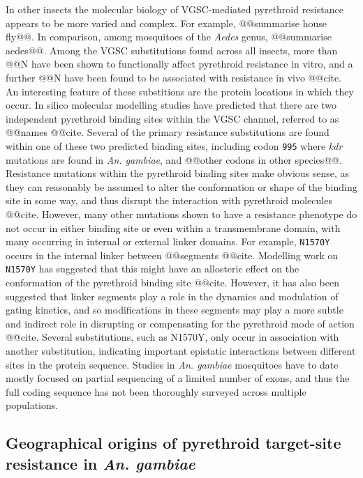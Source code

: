 \documentclass[a4paper,11pt,abstracton,hidelinks]{scrartcl}
\newcommand{\agam}{\textit{An. gambiae}\xspace}
\begin{document}
%
In other insects the molecular biology of VGSC-mediated pyrethroid resistance appears to be more varied and complex.
%
For example, @@summarise house fly@@.
%
In comparison, among mosquitoes of the \textit{Aedes} genus, @@summarise aedes@@.
%
Among the VGSC substitutions found across all insects, more than @@N have been shown to functionally affect pyrethroid resistance in vitro, and a further @@N have been found to be associated with resistance in vivo @@cite.
%
An interesting feature of these substitions are the protein locations in which they occur.
%
In silico molecular modelling studies have predicted that there are two independent pyrethroid binding sites within the VGSC channel, referred to as @@names @@cite.
%
Several of the primary resistance substitutions are found within one of these two predicted binding sites, including codon \texttt{995} where \textit{kdr} mutations are found in \agam, and @@other codons in other species@@.
%
Resistance mutations within the pyrethroid binding sites make obvious sense, as they can reasonably be assumed to alter the conformation or shape of the binding site in some way, and thus disrupt the interaction with pyrethroid molecules @@cite.
%
However, many other mutations shown to have a resistance phenotype do not occur in either binding site or even within a transmembrane domain, with many occurring in internal or external linker domains.
%
For example, \texttt{N1570Y} occurs in the internal linker between @@segments @@cite.
%
Modelling work on \texttt{N1570Y} has suggested that this might have an allosteric effect on the conformation of the pyrethroid binding site @@cite.
%
However, it has also been suggested that linker segments play a role in the dynamics and modulation of gating kinetics, and so modifications in these segments may play a more subtle and indirect role in disrupting or compensating for the pyrethroid mode of action @@cite.
%
Several substitutions, such as N1570Y, only occur in association with another substitution, indicating important epistatic interactions between different sites in the protein sequence.
%
Studies in \agam mosquitoes have to date mostly focused on partial sequencing of a limited number of exons, and thus the full coding sequence has not been thoroughly surveyed across multiple populations.


\subsection*{Geographical origins of pyrethroid target-site resistance in \agam}
\end{document}
